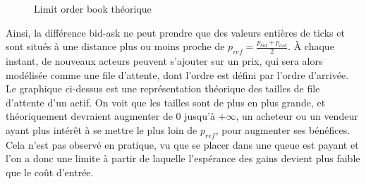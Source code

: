 \documentclass[12pt,a4paper]{article}
\theoremstyle{definition}
\theoremstyle{remark}
\begin{document}
    \begin{figure}[h!]
        \centering
        \caption{Limit order book théorique}
    \end{figure}
Ainsi, la différence bid-ask ne peut prendre que des valeurs entières de ticks et sont situés à une distance plus ou moins proche de $p_{ref} = \frac{p_{bid}+p_{ask}}{2}$. À chaque instant, de nouveaux acteurs peuvent s'ajouter sur un prix, qui sera alors modélisée comme une file d'attente, dont l'ordre est défini par l'ordre d'arrivée. Le graphique ci-dessus est une représentation  théorique des tailles de file d'attente d'un actif. On voit que les tailles sont de plus en plus grande, et théoriquement devraient augmenter de 0 jusqu'à $+\infty$, un acheteur ou un vendeur ayant plus intérêt à se mettre le plus loin de $p_{ref}$, pour augmenter ses bénéfices. Cela n'est pas observé en pratique, vu que se placer dans une queue est payant et l'on a donc une limite à partir de laquelle l’espérance des gains devient plus faible que le coût d'entrée.
\end{document}
